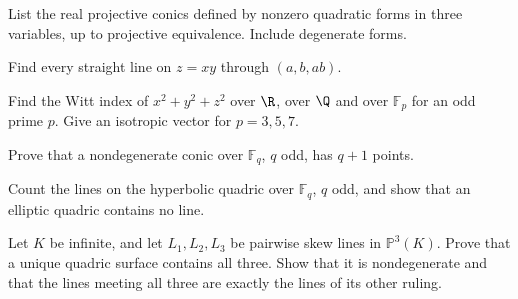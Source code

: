 \begin{exercise}[$\star$]\label{geometry:ex:conicsclass}
List the real projective conics defined by nonzero quadratic forms in
three variables, up to projective equivalence. Include degenerate forms.
\end{exercise}
\begin{exercise}[$\star$]\label{geometry:ex:saddlelines}
Find every straight line on $z=xy$ through $(a,b,ab)$.
\end{exercise}
\begin{exercise}[$\star$]\label{geometry:ex:wittFp}
Find the Witt index of $x^2+y^2+z^2$ over $\R$, over $\Q$ and over
$\mathbb F_p$ for an odd prime $p$. Give an isotropic vector for
$p=3,5,7$.
\end{exercise}
\begin{exercise}[$\star$]\label{geometry:ex:conicFq}
Prove that a nondegenerate conic over $\mathbb F_q$, $q$ odd, has $q+1$
points.
\end{exercise}
\begin{exercise}[$\star\star$]\label{geometry:ex:linesFq}
Count the lines on the hyperbolic quadric over $\mathbb F_q$, $q$ odd,
and show that an elliptic quadric contains no line.
\end{exercise}
\begin{exercise}[$\star\star\star$]\label{geometry:ex:skewlines}
Let $K$ be infinite, and let $L_1,L_2,L_3$ be pairwise skew lines in
$\mathbb P^3(K)$. Prove that a unique quadric surface contains all three.
Show that it is nondegenerate and that the lines meeting all three are
exactly the lines of its other ruling.
\end{exercise}

